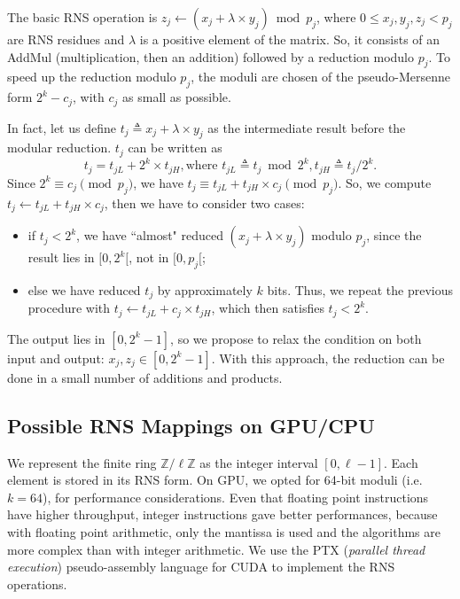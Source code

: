 \documentclass[runningheads,orivec]{llncs}
\begin{document}
The basic RNS operation is $z_j \leftarrow (x_j + \lambda \times y_j)\bmod p_j$, where $0 \leq x_j,y_j,z_j < p_j$ are RNS residues and $\lambda$ is a positive element of the matrix. So, it consists of an AddMul (multiplication, then an addition) followed by a reduction modulo $p_j$. To speed up the reduction modulo $p_j$, the moduli are chosen of the pseudo-Mersenne form $2^{k}-c_j$, with $c_j$ as small as possible. 

In fact, let us define $t_j \triangleq x_j + \lambda \times y_j$ as the intermediate result before the modular reduction. $t_j$ can be written as
\begin{equation}
t_j = t_{jL} + 2^k \times t_{jH}, \textrm{where } t_{jL} \triangleq t_j \bmod 2^{k}, t_{jH} \triangleq t_j / 2^{k}. 
\end{equation}
Since $2^{k} \equiv c_j \pmod {p_j}$, we have
$t_j \equiv t_{jL} + t_{jH} \times c_j \pmod {p_j}$.
So, we compute $t_j \gets t_{jL} + t_{jH} \times c_j$, then we have to consider two cases:
\begin{itemize}
\item if $t_j < 2^k$, we have ``almost" reduced $(x_j + \lambda \times y_j)$ modulo $p_j$, since the result lies in $[0,2^k[$, not in $[0,p_j[$;
\item else we have reduced $t_j$ by approximately $k$ bits. Thus, we repeat the previous procedure with $t_j \leftarrow t_{jL} + c_j \times t_{jH} $, which then satisfies $t_j<2^k$.
\end{itemize} 

The output lies in $[0,2^k-1]$, so we propose to relax the condition on both input and output: $x_j, z_j \in [0,2^{k}-1]$. With this approach, the reduction can be done in a small number of additions and products.







\vspace*{-0.25cm}

\subsection{Possible RNS Mappings on GPU/CPU}
\vspace*{-0.25cm}

We represent the finite ring $\mathbb{Z}/\ell\mathbb{Z}$ as the integer interval $[0,\ell-1]$. Each element is stored in its RNS form. On GPU, we opted for 64-bit moduli (i.e.~$k=64$), for performance considerations. Even that floating point instructions have higher throughput, integer instructions gave better performances, because with floating point arithmetic, only the mantissa is used and the algorithms are more complex than with integer arithmetic. We use the PTX (\textit{parallel thread execution}) pseudo-assembly language for CUDA \cite{PTX30} to implement the RNS operations.
\medskip
\end{document}
